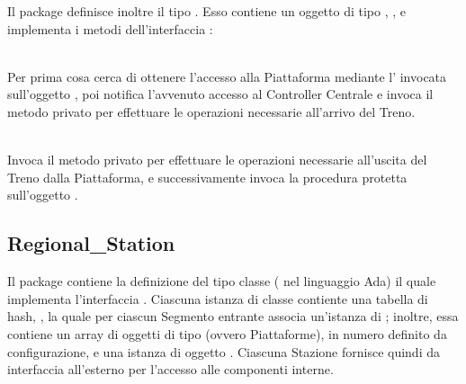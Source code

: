 	Il package  definisce inoltre il tipo  . Esso contiene un oggetto di tipo , , e implementa i metodi dell'interfaccia :
	\begin{description}
		
		\item {}\\
		Per prima cosa cerca di ottenere l'accesso alla Piattaforma mediante l'  invocata sull'oggetto , poi notifica l'avvenuto accesso al Controller Centrale e invoca il metodo privato  per effettuare le operazioni necessarie all'arrivo del Treno.
		
		\item {}\\
		Invoca il metodo privato  per effettuare le operazioni necessarie all'uscita del Treno dalla Piattaforma, e successivamente invoca la procedura protetta  sull'oggetto .
		
	\end{description}
	
	\subsection{Regional\_Station}
	
	Il package  contiene la definizione del tipo classe ( nel linguaggio Ada)  il quale implementa l'interfaccia . Ciascuna istanza di classe  contiente una tabella di hash, , la quale per ciascun Segmento entrante associa un'istanza di ; inoltre, essa contiene un array di oggetti di tipo  (ovvero Piattaforme), in numero definito da configurazione, e una istanza di oggetto . 
	Ciascuna Stazione fornisce quindi da interfaccia all'esterno per l'accesso alle componenti interne.
	
